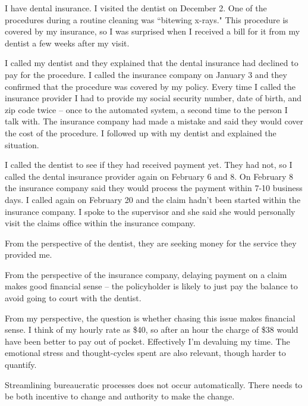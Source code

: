 \begin{mdframed}[frametitle={Dental Insurance},frametitlerule=true,frametitlealignment=\centering]
I have dental insurance. I visited the dentist on December 2. One of the procedures during a routine cleaning was ``bitewing x-rays." This procedure is covered by my insurance, so I was surprised when I received a bill for it from my dentist a few weeks after my visit.

I called my dentist and they explained that the dental insurance had declined to pay for the procedure. I called the insurance company on January 3 and they confirmed that the procedure was covered by my policy. 
Every time I called the insurance provider I had to provide my social security number, date of birth, and zip code twice -- once to the automated system, a second time to the person I talk with. The insurance company had made a mistake and said they would cover the cost of the procedure. I followed up with my dentist and explained the situation.

I called the dentist to see if they had received payment yet. They had not, so I called the dental insurance provider again on February 6 and 8. On February 8 the insurance company said they would process the payment within 7-10 business days. I called again on February 20 and the claim hadn't been started within the insurance company. I spoke to the supervisor and she said she would personally visit the claims office within the insurance company.

From the perspective of the dentist, they are seeking money for the service they provided me.

From the perspective of the insurance company, delaying payment on a claim makes good financial sense -- the policyholder is likely to just pay the balance to avoid going to court with the dentist.

From my perspective, the question is whether chasing this issue makes financial sense. I think of my hourly rate as \$40, so after an hour the charge of \$38 would have been better to pay out of pocket. Effectively I'm devaluing my time. The emotional stress and thought-cycles spent are also relevant, though harder to quantify.

Streamlining bureaucratic processes does not occur automatically. There needs to be both incentive to change and authority to make the change. 
\end{mdframed}

